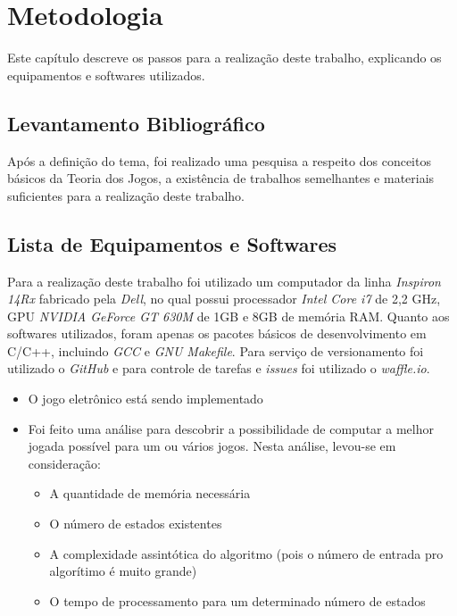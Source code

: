 \chapter[Metodologia]{Metodologia}
\label{cha:metodologia}
	Este capítulo descreve os passos para a realização deste trabalho, explicando os equipamentos e softwares utilizados.

\section{Levantamento Bibliográfico}
\label{sec:levantamento-bibliografico}
Após a definição do tema, foi realizado uma pesquisa a respeito dos conceitos básicos da Teoria dos Jogos, a existência de trabalhos semelhantes e materiais suficientes para a realização deste trabalho.


\section{Lista de Equipamentos e Softwares}
\label{sec:lista-de-equipamentos-e-softwares}

Para a realização deste trabalho foi utilizado um computador da linha \emph{Inspiron 14Rx} fabricado pela \emph{Dell}, no qual possui processador \emph{Intel Core i7} de 2,2 GHz, GPU \emph{NVIDIA GeForce GT 630M} de 1GB e 8GB de memória RAM. Quanto aos softwares utilizados, foram apenas os pacotes básicos de desenvolvimento em C/C++, incluindo \emph{GCC} e \emph{GNU Makefile}. Para serviço de versionamento foi utilizado o \emph{GitHub} e para controle de tarefas e \emph{issues} foi utilizado o \emph{waffle.io}.



\begin{itemize}
\item
  O jogo eletrônico está sendo implementado
\item
  Foi feito uma análise para descobrir a possibilidade de computar a
  melhor jogada possível para um ou vários jogos. Nesta análise,
  levou-se em consideração:

  \begin{itemize}
  \tightlist
  \item
    A quantidade de memória necessária
  \item
    O número de estados existentes
  \item
    A complexidade assintótica do algoritmo (pois o número de entrada
    pro algorítimo é muito grande)
  \item
    O tempo de processamento para um determinado número de estados
  \end{itemize}
\end{itemize}
